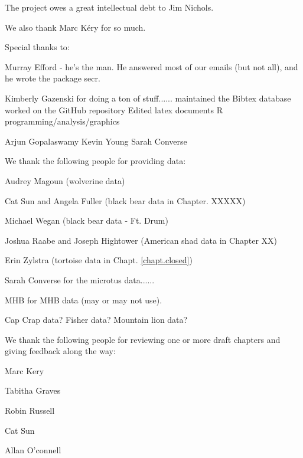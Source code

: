 The project owes a great intellectual debt to Jim Nichols. 

We also thank Marc K\'{e}ry for so much.


Special thanks to:

Murray Efford - he's the man. He answered most of our emails (but not
all), and he wrote the package secr.

Kimberly Gazenski for doing a ton of stuff......
maintained the Bibtex database
worked on the GitHub repository
Edited latex documents
R programming/analysis/graphics

Arjun Gopalaswamy
Kevin Young 
Sarah Converse



We thank the following people for providing data:

Audrey Magoun (wolverine data)

Cat Sun and Angela Fuller (black bear data in Chapter. XXXXX)

Michael Wegan (black bear data - Ft. Drum)

Joshua Raabe and Joseph Hightower (American shad data in Chapter XX)

Erin Zylstra (tortoise data in Chapt. \ref{chapt.closed})

Sarah Converse for the microtus data......

MHB for MHB data (may or may not use).

Cap Crap data? Fisher data?  Mountain lion data?


We thank the following people for reviewing one or more draft chapters
and giving feedback along the way:

Marc Kery

Tabitha Graves

Robin Russell

Cat Sun

Allan O'connell

